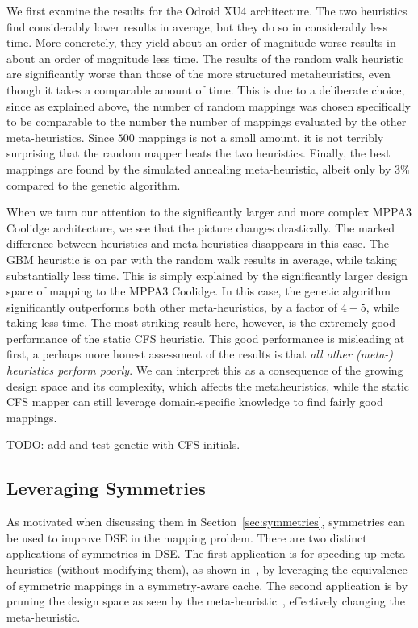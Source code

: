 We first examine the results for the Odroid XU4 architecture.
The two heuristics find considerably lower results in average, but they do so in considerably less time.
More concretely, they yield about an order of magnitude worse results in about an order of magnitude less time.
The results of the random walk heuristic are significantly worse than those of the more structured metaheuristics, even though it takes a comparable amount of time.
This is due to a deliberate choice, since as explained above, the number of random mappings was chosen specifically to be comparable to the number the number of mappings evaluated by the other meta-heuristics.
Since $500$ mappings is not a small amount, it is not terribly surprising that the random mapper beats the two heuristics.
Finally, the best mappings are found by the simulated annealing meta-heuristic, albeit only by $3\%$ compared to the genetic algorithm.

When we turn our attention to the significantly larger and more complex MPPA3 Coolidge architecture, we see that the picture changes drastically.
The marked difference between heuristics and meta-heuristics disappears in this case.
The \ac{GBM} heuristic is on par with the random walk results in average, while taking substantially less time.
This is simply explained by the significantly larger design space of mapping to the MPPA3 Coolidge.
In this case, the genetic algorithm significantly outperforms both other meta-heuristics, by a factor of $4-5$, while taking less time.
The most striking result here, however, is the extremely good performance of the static CFS heuristic.
This good performance is misleading at first, a perhaps more honest assessment of the results is that \emph{all other (meta-) heuristics perform poorly}.
We can interpret this as a consequence of the growing design space and its complexity, which affects the metaheuristics, while the static CFS mapper can still leverage domain-specific knowledge to find fairly good mappings.

TODO: add and test genetic with CFS initials.

\subsection{Leveraging Symmetries}

As motivated when discussing them in Section~\ref{sec:symmetries}, symmetries can be used to improve \ac{DSE} in the mapping problem.
There are two distinct applications of symmetries in \ac{DSE}.
The first application is for speeding up meta-heuristics (without modifying them), as shown in~\cite{goens_taco17}, by leveraging the equivalence of symmetric mappings in a symmetry-aware cache.
The second application is by pruning the design space as seen by the meta-heuristic~\cite{goens_mcsoc18,goens_tcad21}, effectively changing the meta-heuristic.

